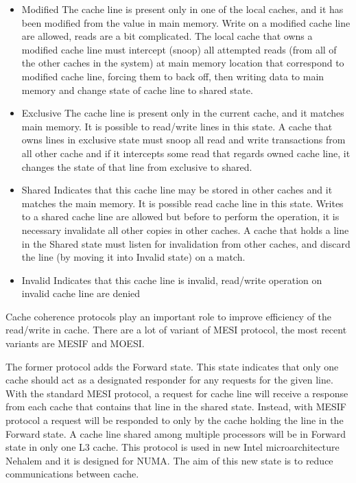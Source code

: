 \begin{itemize}

\item Modified
The cache line is present only in one of the local caches, and it has been modified from the value in main memory. Write on a modified cache line are 
allowed, reads are a bit complicated. The local cache that owns a modified cache line must intercept (snoop) all attempted reads (from all of the other 
caches in the system) at main memory location that correspond to modified cache line, forcing them to back off, then writing data to main memory and change
state of cache line to shared state.
 
\item Exclusive
The cache line is present only in the current cache, and it matches main memory. It is possible to read/write lines in this state. A cache that owns
lines in exclusive state must snoop all read and write transactions from all other cache and if it intercepts some read that regards owned cache line, 
it changes the state of that line from exclusive to shared. 

\item Shared
Indicates that this cache line may be stored in other caches and it matches the main memory. It is possible read cache line in this state. Writes to a 
shared cache line are allowed but before to perform the operation, it is necessary invalidate all other copies in other caches.
A cache that holds a line in the Shared state must listen for invalidation from other caches, and discard the line (by moving it into Invalid state) on a 
match.

\item Invalid
Indicates that this cache line is invalid, read/write operation on invalid cache line are denied

\end{itemize}

Cache coherence protocols play an important role to improve efficiency of the read/write in cache. There are a lot of variant of MESI protocol, the most 
recent variants are MESIF and MOESI.

The former protocol adds the Forward state. This state indicates that only one cache should act as a designated 
responder for any requests for the given line. With the standard MESI protocol, a request for cache line will receive a response from each cache that 
contains that line in the shared state. Instead, with MESIF protocol a request will be responded to only by the cache holding the line in the Forward state.
A cache line shared among multiple processors will be in Forward state in only one L3 cache. This protocol is used in new Intel microarchitecture Nehalem 
and it is designed for NUMA. The aim of this new state is to reduce communications between cache.

